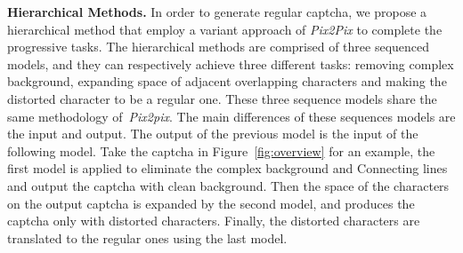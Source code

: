 \noindent \textbf{Hierarchical Methods.} In order to generate regular captcha, we propose a hierarchical method that employ a variant approach of \emph{Pix2Pix} to complete the progressive tasks.
The hierarchical methods are comprised of three sequenced models, and they can respectively achieve three different tasks: removing complex background, expanding space of adjacent overlapping characters and making the distorted character to be a regular one. These three sequence models share the same methodology of~\emph{Pix2pix}.
The main differences of these sequences models are the input and output.
The output of the previous model is the input of the following model.
Take the captcha in Figure~\ref{fig:overview} for an example, the first model is applied to eliminate the complex background and Connecting lines and output the captcha with clean background. Then the space of the characters on the output captcha is expanded by the second model, and produces the captcha only with distorted characters. Finally, the distorted characters are translated to the regular ones using the last model.


